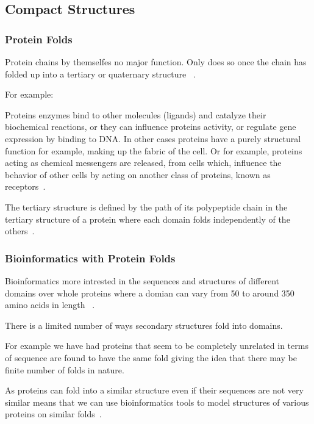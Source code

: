 \documentclass{report}
\begin{document}
\subsection{Compact Structures}

\subsubsection{Protein Folds}

Protein chains by themselfes no major function. Only does so once the chain has folded up into a tertiary or quaternary structure  ~\cite{zvelebil_understanding_2008}. 

For example:

Proteins enzymes bind to other molecules (ligands) and catalyze their biochemical reactions, or they can influence proteins activity, or regulate gene expression by binding to DNA. In other cases proteins have a purely structural function for example, making up the fabric of the cell. Or for example, proteins acting as chemical messengers are released, from cells which, influence the behavior of other cells by acting on another class of proteins, known as receptors~\cite{zvelebil_understanding_2008}.

The tertiary structure is defined by the path of its polypeptide chain in the tertiary structure of a protein where each domain folds independently of the others~\cite{zvelebil_understanding_2008}.

\subsubsection{Bioinformatics with Protein Folds}

Bioinformatics more intrested in the sequences and structures of different domains over whole proteins where a domian can vary from 50 to around 350 amino acids in length ~\cite{zvelebil_understanding_2008}.

There is a limited number of ways secondary structures fold into domains.

For example we have had proteins that seem to be completely unrelated in terms of sequence are found to have the same fold giving the idea that there may be finite number of folds in nature.

As proteins can fold into a similar structure even if their sequences are not very similar means that we can use bioinformatics tools to model structures of various proteins on similar folds~\cite{zvelebil_understanding_2008}.
\end{document}
